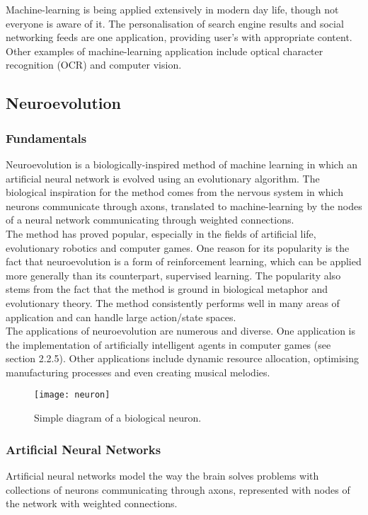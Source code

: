 \documentclass[12pt,a4paper]{article}
\begin{document}
Machine-learning is being applied extensively in modern day life, though not everyone is aware of it. The personalisation of search engine results and social networking feeds are one application, providing user's with appropriate content. \cite{search} Other examples of machine-learning application include optical character recognition (OCR) and computer vision. \cite{ocr}
\newpage
\subsection{Neuroevolution}
\subsubsection{Fundamentals}
Neuroevolution is a biologically-inspired method of machine learning in which an artificial neural network is evolved using an evolutionary algorithm. The biological inspiration for the method comes from the nervous system in which neurons communicate through axons, translated to machine-learning by the nodes of a neural network communicating through weighted connections.\\

The method has proved popular, especially in the fields of artificial life, evolutionary robotics and computer games. One reason for its popularity is the fact that neuroevolution is a form of reinforcement learning, which can be applied more generally than its counterpart, supervised learning. The popularity also stems from the fact that the method is ground in biological metaphor and evolutionary theory. The method consistently performs well in many areas of application and can handle large action/state spaces. \cite{risi}\\

The applications of neuroevolution are numerous and diverse. One application is the implementation of artificially intelligent agents in computer games (see section 2.2.5). Other applications include dynamic resource allocation, optimising manufacturing processes and even creating musical melodies. \cite{neapps}
\begin{figure}[h]
\texttt{[image: neuron]}
\caption{Simple diagram of a biological neuron.}
\end{figure}
\newpage
\subsubsection{Artificial Neural Networks}
Artificial neural networks model the way the brain solves problems with collections of neurons communicating through axons, represented with nodes of the network with weighted connections. \\
\end{document}
